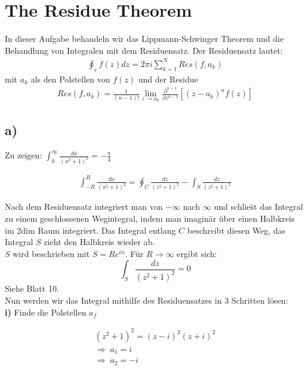 \section{The Residue Theorem}

In dieser Aufgabe behandeln wir das Lippmann-Schwinger Theorem und die
Behandlung von Integralen mit dem Residuensatz. Der Residuensatz lautet:
\begin{align}
\oint_c f \left( z \right) dz = 2 \pi i \sum_{k=1}^{N} Res \left(f,a_k\right)
\end{align}
mit $a_k$ als den Polstellen von $f\left(z\right)$ und der Residue
\begin{align}
Res \left(f, a_k\right) = \frac{1}{\left(n-1\right)!} \lim \limits_{z
\rightarrow a_k} \frac{\partial^{n-1}}{\partial z^{n-1}} \left[
\left(z-a_k\right)^n f \left(z\right) \right]
\end{align}

\subsection{a)}

Zu zeigen: $\int_0^{\infty} \frac{dx}{\left(x^2+1\right)^2} = - \frac{\pi}{4} $

\begin{align}
\int_{-R}^R \frac{dx}{\left(x^2+1\right)^2} = \oint_C
\frac{dz}{\left(z^2+1\right)^2} - \int_S
\frac{dz}{\left(z^2+1\right)^2}
\end{align}

Nach dem Residuensatz integriert man von $- \infty$ nach $\infty$ und schlie\"st
das Integral zu einem geschlossenen Wegintegral, indem man imagin\"ar \"uber
einen Halbkreis im 2dim Raum integriert. Das Integral entlang $C$ beschreibt
diesen Weg, das Integral $S$ zieht den Halbkreis wieder ab. \\
$S$ wird beschrieben mit $S = R e^{i \alpha}$. F\"ur $R \rightarrow \infty$
ergibt sich:
\begin{equation}
\int_S \frac{dz}{\left(z^2+1\right)^2} = 0
\end{equation}
Siehe Blatt 10.\\
Nun werden wir das Integral mithilfe des Residuensatzes in 3 Schritten l\"osen:
\\
\textbf{i)} Finde die Polstellen $a_f$

\begin{align}
\left(z^2+1\right)^2 = \left(z-i\right)^2 \left(z+i\right)^2 \\
\Rightarrow \; a_1 = i \\
\Rightarrow \; a_2 = -i
\end{align}

